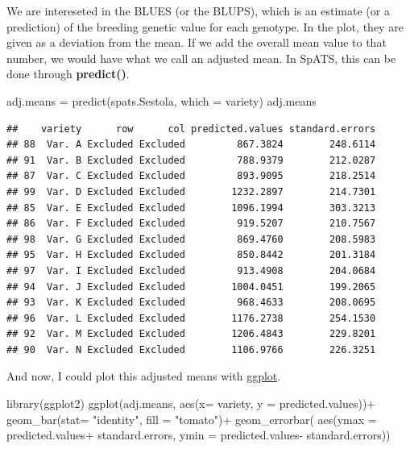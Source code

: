 \documentclass[
]{book}
\newenvironment{Shaded}{\begin{snugshade}}{\end{snugshade}}
\newcommand{\AttributeTok}[1]{\textcolor[rgb]{0.77,0.63,0.00}{#1}}
\newcommand{\FunctionTok}[1]{\textcolor[rgb]{0.00,0.00,0.00}{#1}}
\newcommand{\NormalTok}[1]{#1}
\newcommand{\OtherTok}[1]{\textcolor[rgb]{0.56,0.35,0.01}{#1}}
\newcommand{\SpecialCharTok}[1]{\textcolor[rgb]{0.00,0.00,0.00}{#1}}
\newcommand{\StringTok}[1]{\textcolor[rgb]{0.31,0.60,0.02}{#1}}
\begin{document}
We are intereseted in the BLUES (or the BLUPS), which is an estimate (or a prediction) of the breeding genetic value for each genotype. In the plot, they are given as a deviation from the mean. If we add the overall mean value to that number, we would have what we call an adjusted mean. In SpATS, this can be done through \textbf{predict()}.

\begin{Shaded}
\begin{Highlighting}[]
\NormalTok{adj.means }\OtherTok{=} \FunctionTok{predict}\NormalTok{(spats.Sestola, }\AttributeTok{which =} \StringTok{\textquotesingle{}variety\textquotesingle{}}\NormalTok{)}
\NormalTok{adj.means}
\end{Highlighting}
\end{Shaded}

\begin{verbatim}
##    variety      row      col predicted.values standard.errors
## 88  Var. A Excluded Excluded         867.3824        248.6114
## 91  Var. B Excluded Excluded         788.9379        212.0287
## 87  Var. C Excluded Excluded         893.9095        218.2514
## 99  Var. D Excluded Excluded        1232.2897        214.7301
## 85  Var. E Excluded Excluded        1096.1994        303.3213
## 86  Var. F Excluded Excluded         919.5207        210.7567
## 98  Var. G Excluded Excluded         869.4760        208.5983
## 95  Var. H Excluded Excluded         850.8442        201.3184
## 97  Var. I Excluded Excluded         913.4908        204.0684
## 94  Var. J Excluded Excluded        1004.0451        199.2065
## 93  Var. K Excluded Excluded         968.4633        208.0695
## 96  Var. L Excluded Excluded        1176.2738        254.1530
## 92  Var. M Excluded Excluded        1206.4843        229.8201
## 90  Var. N Excluded Excluded        1106.9766        226.3251
\end{verbatim}

And now, I could plot this adjusted means with \protect\hyperlink{ggplot}{ggplot}.

\begin{Shaded}
\begin{Highlighting}[]
\FunctionTok{library}\NormalTok{(ggplot2)}
\FunctionTok{ggplot}\NormalTok{(adj.means, }\FunctionTok{aes}\NormalTok{(}\AttributeTok{x=}\NormalTok{ variety, }\AttributeTok{y =}\NormalTok{ predicted.values))}\SpecialCharTok{+}
  \FunctionTok{geom\_bar}\NormalTok{(}\AttributeTok{stat=} \StringTok{"identity"}\NormalTok{, }\AttributeTok{fill =} \StringTok{"tomato"}\NormalTok{)}\SpecialCharTok{+}
  \FunctionTok{geom\_errorbar}\NormalTok{( }\FunctionTok{aes}\NormalTok{(}\AttributeTok{ymax =}\NormalTok{ predicted.values}\SpecialCharTok{+}\NormalTok{ standard.errors,}
                     \AttributeTok{ymin =}\NormalTok{ predicted.values}\SpecialCharTok{{-}}\NormalTok{ standard.errors))}
\end{Highlighting}
\end{Shaded}
\end{document}
